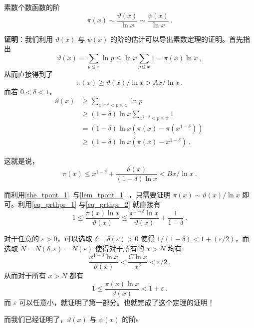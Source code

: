 

\begin{theorem}{素数个数函数的阶}
\begin{equation}
\pi(x) \sim \frac{\vartheta(x)}{\ln x} \sim \frac{\psi(x)}{\ln x} ~.
\end{equation}

\end{theorem}
\textbf{证明}：我们利用 $\vartheta(x)$ 与 $\psi(x)$ 的阶的估计可以导出素数定理的证明。首先指出
\begin{equation}
\vartheta(x) = \sum_{p \le x} \ln p \le \ln x \sum_{p \le x} 1 = \pi(x) \ln x ~,
\end{equation}
从而直接得到了
\begin{equation}\label{eq_prthpr_1}
\pi(x) \ge \vartheta(x)/\ln x > Ax / \ln x ~.
\end{equation}
而若 $0 < \delta < 1$，
\begin{equation}
\begin{aligned}
\vartheta(x) &\ge \sum_{x^{1-\delta} < p \le x} \ln p ~\\
&\ge (1-\delta) \ln x \sum_{x^{1-\delta} < p \le x} 1 ~\\
&= (1-\delta) \ln x \left( \pi(x) - \pi(x^{1-\delta}) \right) ~\\
&\ge (1-\delta) \ln x \left( \pi(x) - x^{1-\delta} \right) ~.
\end{aligned}
\end{equation}

这就是说，
\begin{equation}\label{eq_prthpr_2}
\pi(x) \le x^{1-\delta} + \frac{\vartheta(x)}{(1-\delta) \ln x} < Bx/\ln x ~.
\end{equation}

而利用\autoref{the_tpont_1}~与\autoref{lem_tpont_1}~，只需要证明 $\pi(x) \sim \vartheta(x)/\ln x$ 即可。利用\autoref{eq_prthpr_1} 与\autoref{eq_prthpr_2} 就直接有
\begin{equation}
1 \le \frac{\pi(x) \ln x}{\vartheta(x)} \le \frac{x^{1-\delta} \ln x}{\vartheta(x)} + \frac{1}{1-\delta} ~.
\end{equation}

对于任意的 $\varepsilon > 0$，可以选取 $\delta = \delta(\varepsilon) > 0$ 使得 $1/(1-\delta) < 1+ (\varepsilon/2)$，而选取 $N = N(\delta, \varepsilon) = N(\varepsilon)$ 使得对于所有的 $x > N$ 均有
\begin{equation}
\frac{x^{1-\delta}\ln x}{\vartheta(x)} < \frac{C \ln x}{x^\delta} < \varepsilon/2 ~.
\end{equation}
从而对于所有 $x>N$ 都有
\begin{equation}
1 \le \frac{\pi(x) \ln x}{\vartheta(x)} < 1+ \varepsilon ~.
\end{equation}
而 $\varepsilon$ 可以任意小，就证明了第一部分。也就完成了这个定理的证明！

而我们已经证明了，$\vartheta(x)$ 与 $\psi(x)$ 的阶s




